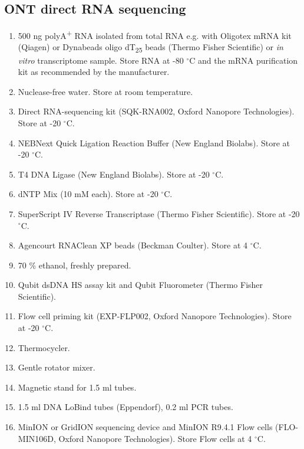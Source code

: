 \documentclass[times, 11pt, a4paper]{article}
\begin{document}
\subsection*{ONT direct RNA sequencing}
\begin{enumerate}
\item 500 ng polyA\textsuperscript{+} RNA isolated from total RNA e.g. with Oligotex mRNA kit (Qiagen) or Dynabeads oligo dT\textsubscript{25} beads (Thermo Fisher Scientific) or \emph{in vitro} transcriptome sample. Store RNA at -80 $^{\circ}$C and the mRNA purification kit as recommended by the manufacturer.

\item Nuclease-free water. Store at room temperature.

\item Direct RNA-sequencing kit (SQK-RNA002, Oxford Nanopore Technologies). Store at -20 $^{\circ}$C.

\item NEBNext Quick Ligation Reaction Buffer (New England Biolabs). Store at -20 $^{\circ}$C.

\item T4 DNA Ligase (New England Biolabs). Store at -20 $^{\circ}$C.

\item dNTP Mix (10 mM each). Store at -20 $^{\circ}$C.

\item SuperScript IV Reverse Transcriptase (Thermo Fisher Scientific). Store at -20 $^{\circ}$C.

\item Agencourt RNAClean XP beads (Beckman Coulter). Store at 4 $^{\circ}$C.

\item 70 \% ethanol, freshly prepared. 

\item Qubit dsDNA HS assay kit and Qubit Fluorometer (Thermo Fisher Scientific).

\item Flow cell priming kit (EXP-FLP002, Oxford Nanopore Technologies). Store at -20 $^{\circ}$C.

\item Thermocycler.

\item Gentle rotator mixer.

\item Magnetic stand for 1.5 ml tubes.

\item 1.5 ml DNA LoBind tubes (Eppendorf), 0.2  ml PCR tubes.

\item MinION or GridION sequencing device and MinION R9.4.1 Flow cells (FLO-MIN106D, Oxford Nanopore Technologies). Store Flow cells at 4 $^{\circ}$C.
\end{enumerate}
\end{document}
